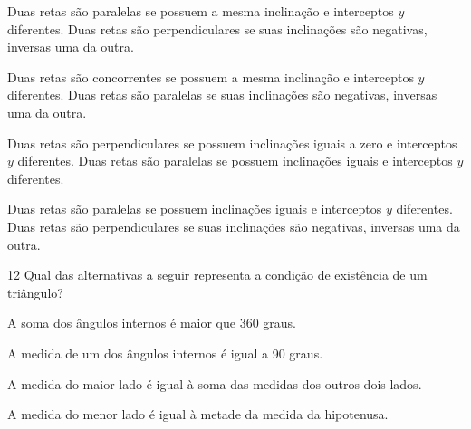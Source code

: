 \begin{escolha}
\item Duas retas são paralelas se possuem a mesma inclinação e interceptos $y$
diferentes. Duas retas são perpendiculares se suas inclinações são
negativas, inversas uma da outra.
\item Duas retas são concorrentes se possuem a mesma inclinação e
interceptos $y$ diferentes. Duas retas são paralelas se suas inclinações são
negativas, inversas uma da outra.
\item Duas retas são perpendiculares se possuem inclinações iguais a zero e
interceptos $y$ diferentes. Duas retas são paralelas se possuem
inclinações iguais e interceptos $y$ diferentes.
\item Duas retas são paralelas se possuem inclinações iguais e interceptos
$y$ diferentes. Duas retas são perpendiculares se suas inclinações são
negativas, inversas uma da outra.
\end{escolha}







\num{12} Qual das alternativas a seguir representa a condição de existência de
um triângulo?

\begin{escolha}
\item A soma dos ângulos internos é maior que 360 graus.
\item A medida de um dos ângulos internos é igual a 90 graus.
\item A medida do maior lado é igual à soma das medidas dos outros dois
lados.
\item A medida do menor lado é igual à metade da medida da hipotenusa.
\end{escolha}

